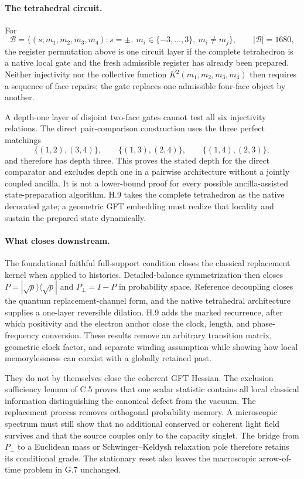 \documentclass[11pt]{article}
\begin{document}
\paragraph{The tetrahedral circuit.}
For
\[
\mathcal B
=
\{(s;m_1,m_2,m_3,m_4):s=\pm,\ m_i\in\{-3,\ldots,3\},\ m_i\ne m_j\},
\qquad |\mathcal B|=1680,
\]
the register permutation above is one circuit layer if the complete tetrahedron is a native local gate and the fresh admissible register has already been prepared. Neither injectivity nor the collective function $K^2(m_1,m_2,m_3,m_4)$ then requires a sequence of face repairs; the gate replaces one admissible four-face object by another.

A depth-one layer of disjoint two-face gates cannot test all six injectivity relations. The direct pair-comparison construction uses the three perfect matchings
\[
\{(1,2),(3,4)\},
\qquad
\{(1,3),(2,4)\},
\qquad
\{(1,4),(2,3)\},
\]
and therefore has depth three. This proves the stated depth for the direct comparator and excludes depth one in a pairwise architecture without a jointly coupled ancilla. It is not a lower-bound proof for every possible ancilla-assisted state-preparation algorithm. H.9 takes the complete tetrahedron as the native decorated gate; a geometric GFT embedding must realize that locality and sustain the prepared state dynamically.

\paragraph{What closes downstream.}
The foundational faithful full-support condition closes the classical replacement kernel when applied to histories. Detailed-balance symmetrization then closes $P=|\sqrt p\rangle\langle\sqrt p|$ and $P_\perp=I-P$ in probability space. Reference decoupling closes the quantum replacement-channel form, and the native tetrahedral architecture supplies a one-layer reversible dilation. H.9 adds the marked recurrence, after which positivity and the electron anchor close the clock, length, and phase-frequency conversion. These results remove an arbitrary transition matrix, geometric clock factor, and separate winding assumption while showing how local memorylessness can coexist with a globally retained past.

They do not by themselves close the coherent GFT Hessian. The exclusion sufficiency lemma of C.5 proves that one scalar statistic contains all local classical information distinguishing the canonical defect from the vacuum. The replacement process removes orthogonal probability memory. A microscopic spectrum must still show that no additional conserved or coherent light field survives and that the source couples only to the capacity singlet. The bridge from $P_\perp$ to a Euclidean mass or Schwinger--Keldysh relaxation pole therefore retains its conditional grade. The stationary reset also leaves the macroscopic arrow-of-time problem in G.7 unchanged.
\end{document}

